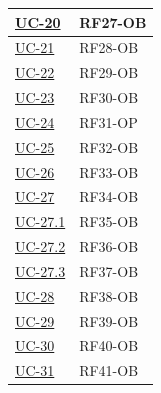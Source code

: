 ﻿\documentclass[a4paper,12pt]{article}
\begin{document}
{\begin{longtable}{|p{4cm}|p{4cm}|}
    \hline
    \hyperref[fig:uc-20]{UC-20} & RF27-OB \\
    \hline
    \hyperref[fig:uc-21]{UC-21} & RF28-OB \\
    \hline
    \hyperref[fig:uc-22]{UC-22} & RF29-OB \\
    \hline
    \hyperref[fig:uc-23]{UC-23} & RF30-OB \\
    \hline
    \hyperref[fig:uc-24]{UC-24} & RF31-OP \\
    \hline
    \hyperref[fig:uc-25]{UC-25} & RF32-OB \\
    \hline
    \hyperref[fig:uc-26]{UC-26} & RF33-OB \\
    \hline
    \hyperref[fig:uc-27]{UC-27} & RF34-OB \\
    \hline
    \hyperref[fig:uc-27.1]{UC-27.1} & RF35-OB \\
    \hline
    \hyperref[fig:uc-27.2]{UC-27.2} & RF36-OB \\
    \hline
    \hyperref[fig:uc-27.3]{UC-27.3} & RF37-OB \\
    \hline
    \hyperref[fig:uc-28]{UC-28} & RF38-OB \\
    \hline
    \hyperref[fig:uc-29]{UC-29} & RF39-OB \\
    \hline
    \hyperref[fig:uc-30]{UC-30} & RF40-OB \\
    \hline
    \hyperref[fig:uc-31]{UC-31} & RF41-OB \\
    \hline


\end{longtable}}
\end{document}

